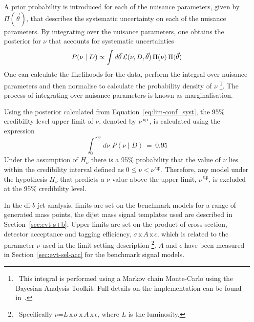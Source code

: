 \newpage
A prior probability is introduced for each of the nuisance parameters, given by $\Pi(\vec{\theta})$,
that describes the systematic uncertainty on each of the nuisance parameters.
By integrating over the nuisance parameters,
one obtains the posterior for $\nu$ that accounts for systematic uncertainties
\begin{equation}
  P(\nu \mid D) \propto \int d \vec{\theta} \, \mathcal{L} (\nu, D, \vec{\theta} ) \, \Pi( \nu )  \, \Pi(\vec{\theta})
  \label{eq:lim-conf_syst}
\end{equation}
One can calculate the likelihoods for the data,
perform the integral over nuisance parameters
and then normalise to calculate the probability density of $\nu$
\footnote{\ This integral is performed using a Markov chain Monte-Carlo using the Bayesian Analysis Toolkit.
  Full details on the implementation can be found in~\cite{det-thesis_kate}.}.
The process of integrating over nuisance parameters is known as marginalisation.

Using the posterior calculated from Equation~\ref{eq:lim-conf_syst},
the 95\% credibility level upper limit of $\nu$, denoted by $\nu^{\,\text{up}}\,$,
is calculated using the expression
\begin{equation}
\int_0^{\nu^{\,\text{up}}} d \nu \, \, P(\nu \mid D)~=~0.95
\end{equation}
Under the assumption of $H_{\nu}$ there is a 95\% probability that the value of $\nu$ lies
within the credibility interval defined as \mbox{$0 \leq \nu < \nu^{\,\text{up}}$}.
Therefore, any model under the hypothesis $H_{\nu}$ that predicts a $\nu$
value above the upper limit, $\nu^{\,\text{up}}$, is excluded at the 95\% credibility level.

In the di-$b$-jet analysis, limits are set on the benchmark models for a range of generated mass points,
the dijet mass signal templates used are described in Section~\ref{sec:evt-s+b}.
Upper limits are set on the product of cross-section, detector acceptance and tagging efficiency,
$\sigma\,\text{x}\,\mathit{A}\,\text{x}\,\epsilon$,
which is related to the parameter $\nu$ used in the limit setting description
\footnote{\ 
  Specifically $\nu$=$L\,\text{x}\,\sigma\,\text{x}\,\mathit{A}\,\text{x}\,\epsilon$, where $L$ is the luminosity.
}.
$\mathit{A}$ and $\epsilon$ have been measured in Section~\ref{sec:evt-sel-acc} for the benchmark signal models.

